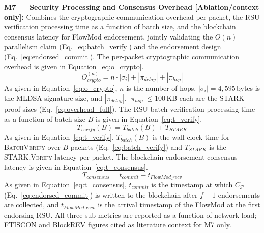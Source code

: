 \documentclass[12pt, a4paper]{report}
\begin{document}
{{\textbf{M7 — Security Processing and Consensus
Overhead [Ablation/context only]:}
Combines the cryptographic communication overhead
per packet, the RSU verification processing time
as a function of batch size, and the blockchain
consensus latency for FlowMod endorsement, jointly
validating the $O(n)$ parallelism claim
(Eq.~\ref{eq:batch_verify}) and the endorsement
design (Eq.~\ref{eq:endorsed_commit}).
The per-packet cryptographic communication overhead
is given in Equation~\eqref{eq:o_crypto}.
\begin{equation}
O_{crypto}^{(n)} =
n \cdot |\sigma_i|
+ |\pi_{delay}| + |\pi_{hop}|
\label{eq:o_crypto}
\end{equation}
As given in Equation~\eqref{eq:o_crypto},
$n$ is the number of hops, $|\sigma_i| =
4{,}595$\,bytes is the \ac{MLDSA} signature
size, and $|\pi_{delay}|$, $|\pi_{hop}|
\leq 100$\,KB each are the \ac{STARK} proof
sizes (Eq.~\ref{eq:overhead_full}).
The \ac{RSU} batch verification processing time
as a function of batch size $B$ is given in
Equation~\eqref{eq:t_verify}.
\begin{equation}
T_{verify}(B) =
T_{batch}(B) + T_{STARK}
\label{eq:t_verify}
\end{equation}
As given in Equation~\eqref{eq:t_verify},
$T_{batch}(B)$ is the wall-clock time for
\textsc{BatchVerify} over $B$ packets
(Eq.~\ref{eq:batch_verify}) and $T_{STARK}$
is the \textsc{STARK.Verify} latency per packet.
The blockchain endorsement consensus latency
is given in Equation~\eqref{eq:t_consensus}.
\begin{equation}
T_{consensus} =
t_{commit} - t_{FlowMod\_recv}
\label{eq:t_consensus}
\end{equation}
As given in Equation~\eqref{eq:t_consensus},
$t_{commit}$ is the timestamp at which
$C_\mathcal{P}$ (Eq.~\ref{eq:endorsed_commit})
is written to the blockchain after $f{+}1$
endorsements are collected, and
$t_{FlowMod\_recv}$ is the arrival timestamp
of the FlowMod at the first endorsing \ac{RSU}.
All three sub-metrics are reported as a function
of network load; \ac{FTISCON} and \ac{BlockREV}
figures cited as literature context for M7 only.



}}
\end{document}
